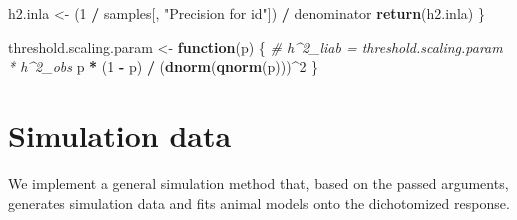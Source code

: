 \documentclass[
]{article}
\newenvironment{Shaded}{\begin{snugshade}}{\end{snugshade}}
\newcommand{\CommentTok}[1]{\textcolor[rgb]{0.56,0.35,0.01}{\textit{#1}}}
\newcommand{\ControlFlowTok}[1]{\textcolor[rgb]{0.13,0.29,0.53}{\textbf{#1}}}
\newcommand{\DecValTok}[1]{\textcolor[rgb]{0.00,0.00,0.81}{#1}}
\newcommand{\FunctionTok}[1]{\textcolor[rgb]{0.13,0.29,0.53}{\textbf{#1}}}
\newcommand{\NormalTok}[1]{#1}
\newcommand{\OtherTok}[1]{\textcolor[rgb]{0.56,0.35,0.01}{#1}}
\newcommand{\SpecialCharTok}[1]{\textcolor[rgb]{0.81,0.36,0.00}{\textbf{#1}}}
\newcommand{\StringTok}[1]{\textcolor[rgb]{0.31,0.60,0.02}{#1}}
\begin{document}
\begin{Shaded}
\begin{Highlighting}[]
\NormalTok{  h2.inla }\OtherTok{\textless{}{-}}\NormalTok{ (}\DecValTok{1} \SpecialCharTok{/}\NormalTok{ samples[, }\StringTok{"Precision for id"}\NormalTok{]) }\SpecialCharTok{/}\NormalTok{ denominator}
  \FunctionTok{return}\NormalTok{(h2.inla)}
\NormalTok{\}}

\NormalTok{threshold.scaling.param }\OtherTok{\textless{}{-}} \ControlFlowTok{function}\NormalTok{(p) \{}
  \CommentTok{\# h\^{}2\_liab = threshold.scaling.param * h\^{}2\_obs}
\NormalTok{  p }\SpecialCharTok{*}\NormalTok{ (}\DecValTok{1} \SpecialCharTok{{-}}\NormalTok{ p) }\SpecialCharTok{/}\NormalTok{ (}\FunctionTok{dnorm}\NormalTok{(}\FunctionTok{qnorm}\NormalTok{(p)))}\SpecialCharTok{\^{}}\DecValTok{2}
\NormalTok{\}}
\end{Highlighting}
\end{Shaded}

\hypertarget{simulation-data}{%
\section*{Simulation data}\label{simulation-data}}

We implement a general simulation method that, based on the passed
arguments, generates simulation data and fits animal models onto the
dichotomized response.
\end{document}

